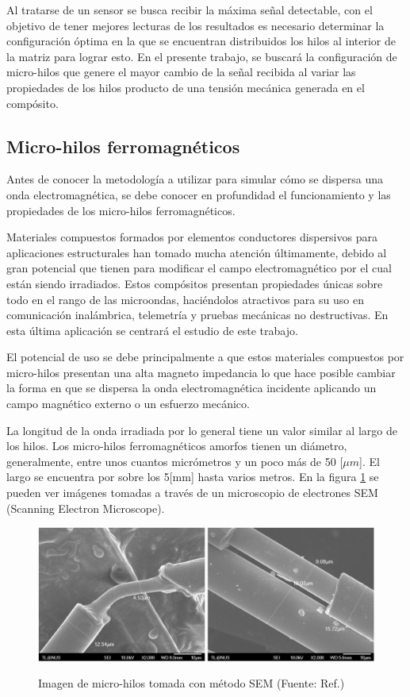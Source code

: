 \documentclass[12pt,letterpaper]{article}
\numberwithin{equation}{section}
\begin{document}
Al tratarse de un sensor se busca recibir la máxima señal detectable, con el objetivo de tener mejores lecturas de los resultados es necesario determinar la configuración óptima en la que se encuentran distribuidos los hilos al interior de la matriz para lograr esto. En el presente trabajo, se buscará la configuración de micro-hilos que genere el mayor cambio de la señal recibida al variar las propiedades de los hilos producto de una tensión mecánica generada en el compósito.   

\subsection{Micro-hilos ferromagnéticos} \label{subsec Microhilos ferromagneticos}
Antes de conocer la metodología a utilizar para simular cómo se dispersa una onda electromagnética, se debe conocer en profundidad el funcionamiento y las propiedades de los micro-hilos ferromagnéticos. 

Materiales compuestos formados por elementos conductores dispersivos para aplicaciones estructurales han tomado mucha atención últimamente, debido al gran potencial que tienen para modificar el campo electromagnético por el cual están siendo irradiados. Estos compósitos presentan propiedades únicas sobre todo en el rango de las microondas, haciéndolos atractivos para su uso en comunicación inalámbrica, telemetría y pruebas mecánicas no destructivas. En esta última aplicación se centrará el estudio de este trabajo.

El potencial de uso se debe principalmente a que estos materiales compuestos por micro-hilos presentan una alta magneto impedancia lo que hace posible cambiar la forma en que se dispersa la onda electromagnética incidente aplicando un campo magnético externo o un esfuerzo mecánico. 

La longitud de la onda irradiada por lo general tiene un valor similar al largo de los hilos. Los micro-hilos ferromagnéticos amorfos tienen un diámetro, generalmente, entre unos cuantos micrómetros y un poco más de 50 [$\mu m$]. El largo se encuentra por sobre los 5[mm] hasta varios metros. En la figura \ref{fig:SEM} se pueden ver imágenes tomadas a través de un microscopio de electrones SEM (Scanning Electron Microscope).

\begin{figure}[H]
	\centering\includegraphics[scale=0.3]{Imagenes/MEB.png}\\
	\caption{Imagen de micro-hilos tomada con método SEM (Fuente: Ref.\cite{Wire_permeability})}
	\label{fig:SEM}
\end{figure} 
\end{document}
